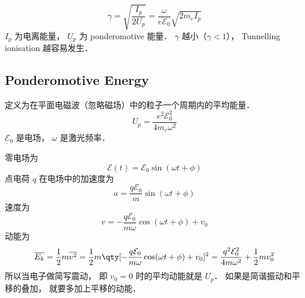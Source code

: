 
\begin{equation}
\gamma = \sqrt{\frac{I_p}{2U_p}} = \frac{\omega}{e\mathcal E_0} \sqrt{2m_e I_p}
\end{equation}
$I_p$ 为电离能量， $U_p$ 为 ponderomotive 能量． $\gamma$ 越小（$\gamma < 1$）， Tunnelling ionisation 越容易发生．

\subsection{Ponderomotive Energy}
定义为在平面电磁波（忽略磁场）中的粒子一个周期内的平均能量．
\begin{equation}
U_p = \frac{e^2 \mathcal E_0^2}{4m_e\omega^2}
\end{equation}
$\mathcal E_0$ 是电场， $\omega$ 是激光频率．

零电场为
\begin{equation}
\mathcal E(t) = \mathcal E_0 \sin(\omega t + \phi)
\end{equation}
点电荷 $q$ 在电场中的加速度为
\begin{equation}
a = \frac{q\mathcal E_0}{m} \sin(\omega t + \phi)
\end{equation}
速度为
\begin{equation}
v = -\frac{q\mathcal E_0}{m\omega} \cos(\omega t + \phi) + v_0
\end{equation}
动能为
\begin{equation}
\overline{E_k} = \frac{1}{2}m \overline{v^2} = \frac{1}{2}m \qty[-\frac{q\mathcal E_0}{m\omega} \cos(\omega t + \phi) + v_0]^2 = \frac{q^2\mathcal E_0^2}{4m\omega^2} + \frac{1}{2}mv_0^2
\end{equation}
所以当电子做简写震动， 即 $v_0 = 0$ 时的平均动能就是 $U_p$． 如果是简谐振动和平移的叠加， 就要多加上平移的动能．
